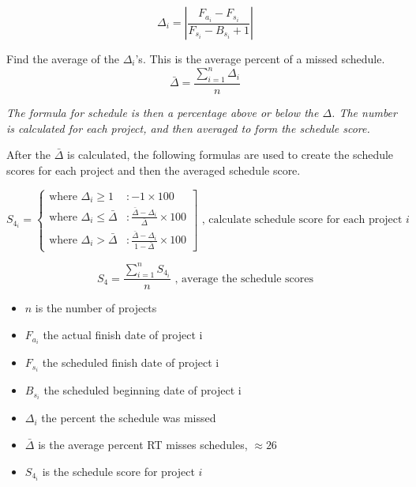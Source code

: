 \documentclass[SDSUThesis.tex]{subfiles}
\begin{document}
                \begin{displaymath}
                    \Delta_i = \left| \frac{F_{a_i} - F_{s_i}}{ F_{s_i} - B_{s_i} + 1} \right|
                \end{displaymath}
                
                Find the average of the $\Delta_i$'s.  This is the average percent of a missed
                schedule.  
                \begin{displaymath}
                   \bar{\Delta}  = \frac{\sum^n_{i=1}\Delta_i}{n}
                \end{displaymath}
                
                \textit{The formula for schedule is then a percentage above or below the $\Delta$.  
                The number is calculated for each project, and then averaged to form the schedule score.}
                
                After the $\bar{\Delta}$ is calculated, the following formulas are used to create the schedule scores
                for each project and then the averaged schedule score.
            
                \begin{displaymath}
                   S_{4_i} = \left\{
                     \begin{array}{lr}
                        \text{where } \Delta_i \geq 1 & : -1 \times 100 \\
                       \text{where }  \Delta_i \leq \bar{\Delta} & : \frac{\bar{\Delta} - \Delta_i}{\bar{\Delta}}   \times 100  \\
                       \text{where } \Delta_i > \bar{\Delta} & : \frac{\bar{\Delta} - \Delta_i}{1 - \bar{\Delta}} \times 100
                     \end{array}
                   \right] \text{   , calculate schedule score for each project $i$}
                \end{displaymath} 
        
                \[
                    S_{4} = \frac{\sum^n_{i=1} S_{4_i}}{n} \text{   , average the schedule scores}
                \]
                \begin{itemize}
                    \item $n$ is the number of projects
                    \item $F_{a_i}$ the actual finish date of project i
                    \item $F_{s_i}$ the scheduled finish date of project i
                    \item $B_{s_i}$ the scheduled beginning date of project i
                    \item $\Delta_i$ the percent the schedule was missed
                    \item $\bar{\Delta}$ is the average percent RT misses schedules, $\approx 26$
                    \item $S_{4_i}$ is the schedule score for project $i$
                \end{itemize}
    
\end{document}

